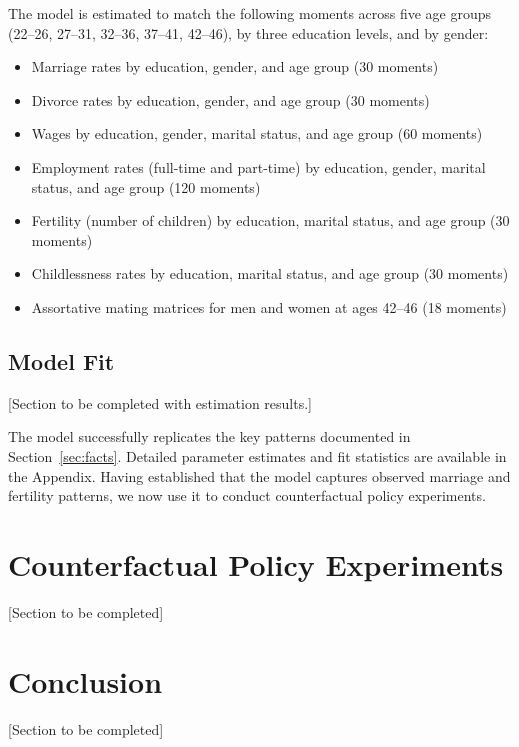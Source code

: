\documentclass[12pt]{article}
\begin{document}
The model is estimated to match the following moments across five age groups (22--26, 27--31, 32--36, 37--41, 42--46), by three education levels, and by gender:

\begin{itemize}
    \item Marriage rates by education, gender, and age group (30 moments)
    \item Divorce rates by education, gender, and age group (30 moments)
    \item Wages by education, gender, marital status, and age group (60 moments)
    \item Employment rates (full-time and part-time) by education, gender, marital status, and age group (120 moments)
    \item Fertility (number of children) by education, marital status, and age group (30 moments)
    \item Childlessness rates by education, marital status, and age group (30 moments)
    \item Assortative mating matrices for men and women at ages 42--46 (18 moments)
\end{itemize}

\subsection{Model Fit}

[Section to be completed with estimation results.]

The model successfully replicates the key patterns documented in Section~\ref{sec:facts}. Detailed parameter estimates and fit statistics are available in the Appendix. Having established that the model captures observed marriage and fertility patterns, we now use it to conduct counterfactual policy experiments.

\section{Counterfactual Policy Experiments} \label{sec:counterfactuals}

[Section to be completed]

\section{Conclusion} \label{sec:conclusion}

[Section to be completed]



\end{document}
